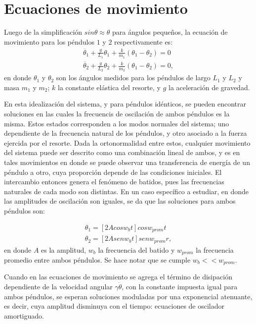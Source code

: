 \documentclass[%
 aip,
rsi,%
 amsmath,amssymb,
 reprint,%
]{revtex4-1}
\begin{document}
\section{Ecuaciones de movimiento}
Luego de la simplificaci\'on $sin \theta \approx \theta$ para \'angulos peque\~nos, la ecuaci\'on de movimiento para los p\'endulos $1$ y $2$ respectivamente es:
\begin{eqnarray}
\ddot{\theta_1}+\frac{g}{L_1}\theta_1+\frac{k}{m_1}(\theta_1-\theta_2)=0
\label{pendulo1}
\\
\ddot{\theta_2}+\frac{g}{L_2}\theta_2+\frac{k}{m_2}(\theta_1-\theta_2)=0
\label{pendulo2},
\end{eqnarray}
en donde $\theta_1$ y $\theta_2$ son los \'angulos medidos para los p\'endulos de largo $L_1$ y $L_2$ y masa $m_1$ y $m_2$; $k$ la constante el\'astica del resorte, y $g$ la aceleraci\'on de gravedad.

En esta idealizaci\'on del sistema, y para p\'endulos id\'enticos, se pueden encontrar soluciones en las cuales la frecuencis de oscilaci\'on de ambos p\'endulos es la misma. Estos estados corresponden a los modos normales del sistema; uno dependiente de la frecuencia natural de los p\'endulos, y otro asociado a la fuerza ejercida por el resorte. Dada la ortonormalidad entre estos, cualquier movimiento del sistema puede ser descrito como una combinaci\'on lineal de ambos, y es en tales movimientos en donde se puede observar una transferencia de energ\'ia de un p\'endulo a otro, cuya proporci\'on depende de las condiciones iniciales. El intercambio entonces genera el fen\'omeno de batidos, pues las frecuencias naturales de cada modo son distintas. En un caso espec\'ifico a estudiar, en donde las amplitudes de oscilaci\'on son iguales, se da que las soluciones para ambos p\'endulos son:

\begin{eqnarray}
\theta_1=[2Acosw_bt]cosw_{prom}t\label{totalenergia1}\\ \theta_2=[2Asenw_bt]senw_{prom}r\label{totalenergia2},
\end{eqnarray}
en donde $A$ es la amplitud, $w_b$ la frecuencia del batido y $w_{prom}$ la frecuencia promedio entre ambos p\'endulos. Se hace notar que se cumple $w_b<<w_{prom}$\cite{batidos}.


Cuando en las ecuaciones de movimiento se agrega el t\'ermino de disipaci\'on dependiente de la velocidad angular $\gamma \dot{\theta}$, con la constante impuesta igual para ambos p\'endulos, se esperan soluciones moduladas por una exponencial atenuante, es decir, cuya amplitud disminuya con el tiempo: ecuaciones de oscilador amortiguado.
\end{document}
